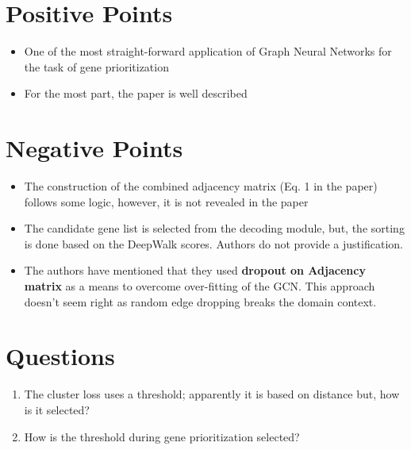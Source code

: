 \section{Positive Points}
\begin{itemize}
    \item One of the most straight-forward application of Graph Neural Networks
        for the task of gene prioritization
    \item For the most part, the paper is well described
\end{itemize}


\section{Negative Points}
\begin{itemize}
    \item The construction of the combined adjacency matrix (Eq. 1 in the paper)
        follows some logic, however, it is not revealed in the paper
    \item The candidate gene list is selected from the decoding module, but, the
        sorting is done based on the DeepWalk scores. Authors do not provide a
        justification.
    \item The authors have mentioned that they used \textbf{dropout on Adjacency matrix}
        as a means to overcome over-fitting of the GCN. This approach doesn't seem
        right as random edge dropping breaks the domain context.
\end{itemize}


\section{Questions}
\begin{enumerate}
    \item The cluster loss uses a threshold; apparently it is based on distance
        but, how is it selected?
    \item How is the threshold during gene prioritization selected?
\end{enumerate}